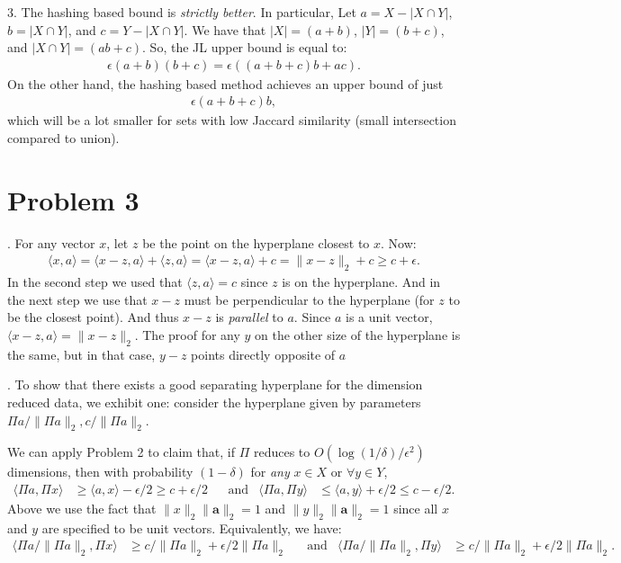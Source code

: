\documentclass[11pt]{article}
\newcommand{\bv}[1]{\mathbf{#1}}
\begin{document}
\vspace{.5em}
3. The hashing based bound is \emph{strictly better}. In particular, Let $a = X - |X\cap Y|$, $b = |X\cap Y|$, and $c = Y - |X\cap Y|$. We have that $|X| = (a+b)$, $|Y| = (b+c)$,  and $|X\cap Y|= (ab+c)$. So, the JL upper bound is equal to: 
\begin{align*}
	\epsilon (a+b)(b+c) = \epsilon\left((a+b+c)b + ac\right).
\end{align*}
On the other hand, the hashing based method achieves an upper bound of just 
\begin{align*}
	 \epsilon(a+b+c)b, 
\end{align*}
which will be a lot smaller for sets with low Jaccard similarity (small intersection compared to union). 

\section*{Problem 3}
	\smallskip{}.\hspace{1em}
	For any vector $x$, let $z$ be the point on the hyperplane closest to $x$. Now: 
	\begin{align*}
	\langle x, a \rangle = \langle x - z, a \rangle  + \langle z, a \rangle  = \langle x - z, a \rangle +c = \|x - z\|_2 + c \geq c + \epsilon.
	\end{align*}
In the second step we used that  $\langle z, a \rangle =c$ since $z$ is on the hyperplane. And in the next step we use that $x - z$ must be perpendicular to the hyperplane (for $z$ to be the closest point). And thus $x - z$ is \emph{parallel} to $a$. Since $a$ is a unit vector, $\langle x - z, a \rangle= \|x-z\|_2$. The proof for any $y$ on the other size of the hyperplane is the same, but in that case, $y-z$ points directly opposite of $a$
	
	\smallskip{}.\hspace{1em}	
	To show that there exists a good separating hyperplane for the dimension reduced data, we  exhibit one: consider the hyperplane given by parameters $\Pi a/\|\Pi a\|_2 , c/\|\Pi a\|_2$. 
	
	We can apply Problem 2 to claim that, if $\Pi$ reduces to $O(\log(1/\delta)/\epsilon^2)$ dimensions, then with probability $(1-\delta)$ for \emph{any} $x \in X$ or $\forall y \in Y$,
	\begin{align*}
	\langle \Pi a, \Pi x \rangle &\geq \langle a, x \rangle - \epsilon/2 \geq c + \epsilon/2 & &\text{and} & \langle \Pi a, \Pi y \rangle &\leq \langle a, y \rangle + \epsilon/2 \leq c - \epsilon/2.
	\end{align*}
	Above we use the fact that $\|x\|_2\|\bv{a}\|_2 = 1$ and $\|y\|_2\|\bv{a}\|_2 = 1$ since all $x$ and $y$ are specified to be unit vectors. Equivalently, we have:
	\begin{align}
	\label{eq:4}
	\langle \Pi a/\|\Pi a\|_2, \Pi x \rangle &\geq c/\|\Pi a\|_2 + \epsilon/2\|\Pi a\|_2 & &\text{and} & \langle \Pi a/\|\Pi a\|_2, \Pi y \rangle &\geq c/\|\Pi a\|_2 + \epsilon/2\|\Pi a\|_2.
	\end{align}
	
\end{document}
